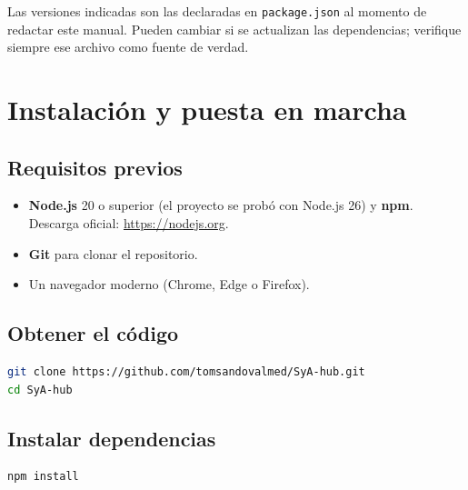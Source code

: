 \documentclass[11pt,a4paper]{article}
\newcommand{\ruta}[1]{\texttt{#1}}
\begin{document}
\begin{nota}
Las versiones indicadas son las declaradas en \ruta{package.json} al momento de
redactar este manual. Pueden cambiar si se actualizan las dependencias; verifique
siempre ese archivo como fuente de verdad.
\end{nota}

\section{Instalación y puesta en marcha}

\subsection{Requisitos previos}
\begin{itemize}[leftmargin=*]
  \item \textbf{Node.js} 20 o superior (el proyecto se probó con Node.js 26) y \textbf{npm}.
        Descarga oficial: \url{https://nodejs.org}.
  \item \textbf{Git} para clonar el repositorio.
  \item Un navegador moderno (Chrome, Edge o Firefox).
\end{itemize}

\subsection{Obtener el código}
\begin{lstlisting}[language=bash]
git clone https://github.com/tomsandovalmed/SyA-hub.git
cd SyA-hub
\end{lstlisting}

\subsection{Instalar dependencias}
\begin{lstlisting}[language=bash]
npm install
\end{lstlisting}
\end{document}

